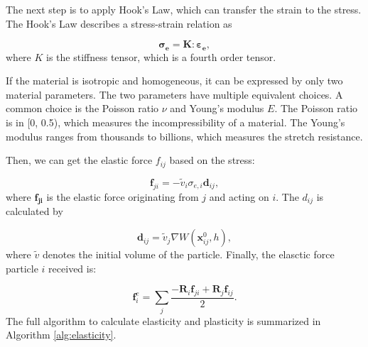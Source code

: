 \documentclass[10pt,journal,compsoc]{IEEEtran}
\begin{document}
The next step is to apply Hook's Law, which can transfer the strain to the stress. The Hook's Law describes a stress-strain relation as

\begin{equation}
	{
		\mathbf{\sigma_e} = \mathbf{K} : \mathbf {\varepsilon_e},
	}
	\label{eq:Hooks-law}
\end{equation}
where $K$ is the stiffness tensor, which is a fourth order tensor.

If the material is isotropic and homogeneous, it can be expressed by only two material parameters. The two parameters have multiple equivalent choices. A common choice is the Poisson ratio $\nu$ and Young's modulus $E$. The Poisson ratio is in [0, 0.5), which measures the incompressibility of a material. The Young's modulus ranges from thousands to billions, which measures the stretch resistance.


Then, we can get the elastic force $f_{ij}$ based on the stress:

\begin{equation}
	\mathbf{f}_{j i}=-\tilde{v}_i \sigma_{e,i} \mathbf{d}_{i j} \label{eq:elastic-force-fji},
\end{equation}
where $\mathbf{f_{ji}}$ is the elastic force originating from $j$ and acting on $i$. The $d_{ij}$ is calculated by


\begin{equation}
	\mathbf{d}_{i j}=\tilde{v}_j \nabla W\left(\mathbf{x}_{i j}^0, h\right),
\end{equation}
where $\tilde{v}$ denotes the initial volume of the particle.
Finally, the elasctic force particle $i$ received is:

\begin{equation}
	\mathbf{f}_{i}^e=\sum_j \frac{-\mathbf{R}_i {\mathbf{f}}_{j i}+\mathbf{R}_j {\mathbf{f}}_{i j}}{2}.
	\label{eq:elastic-force-fi}
\end{equation}
The full algorithm to calculate elasticity and plasticity is summarized in Algorithm \ref{alg:elasticity}.
\end{document}
